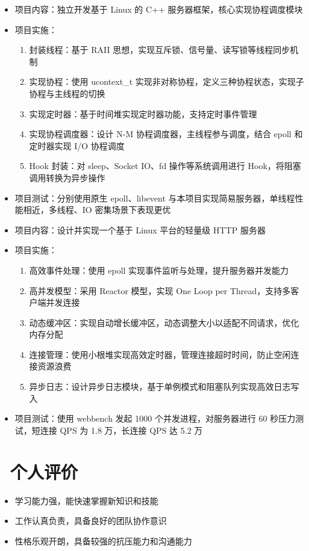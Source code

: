 \documentclass{resume}
\begin{document}
\begin{itemize}
  \item 项目内容：独立开发基于 Linux 的 C++ 服务器框架，核心实现协程调度模块
  \item 项目实施：
    \begin{enumerate}[label=\arabic*. ]
      \item 封装线程：基于 RAII 思想，实现互斥锁、信号量、读写锁等线程同步机制
      \item 实现协程：使用 ucontext_t 实现非对称协程，定义三种协程状态，实现子协程与主线程的切换
      \item 实现定时器：基于时间堆实现定时器功能，支持定时事件管理
      \item 实现协程调度器：设计 N-M 协程调度器，主线程参与调度，结合 epoll 和定时器实现 I/O 协程调度
      \item Hook 封装：对 sleep、Socket IO、fd 操作等系统调用进行 Hook，将阻塞调用转换为异步操作
    \end{enumerate}
  \item 项目测试：分别使用原生 epoll、libevent 与本项目实现简易服务器，单线程性能相近，多线程、IO 密集场景下表现更优
\end{itemize}


\begin{itemize}
  \item 项目内容：设计并实现一个基于 Linux 平台的轻量级 HTTP 服务器
  \item 项目实施：
    \begin{enumerate}[label=\arabic*. ]
      \item 高效事件处理：使用 epoll 实现事件监听与处理，提升服务器并发能力
      \item 高并发模型：采用 Reactor 模型，实现 One Loop per Thread，支持多客户端并发连接
      \item 动态缓冲区：实现自动增长缓冲区，动态调整大小以适配不同请求，优化内存分配
      \item 连接管理：使用小根堆实现高效定时器，管理连接超时时间，防止空闲连接资源浪费
      \item 异步日志：设计异步日志模块，基于单例模式和阻塞队列实现高效日志写入
    \end{enumerate}
   \item 项目测试：使用 webbench 发起 1000 个并发进程，对服务器进行 60 秒压力测试，短连接 QPS 为 1.8 万，长连接 QPS 达 5.2 万
\end{itemize}

\section{\faInfo\ 个人评价}
\begin{itemize}[parsep=0.5ex]
  \item 学习能力强，能快速掌握新知识和技能
  \item 工作认真负责，具备良好的团队协作意识
  \item 性格乐观开朗，具备较强的抗压能力和沟通能力
\end{itemize}
\end{document}
